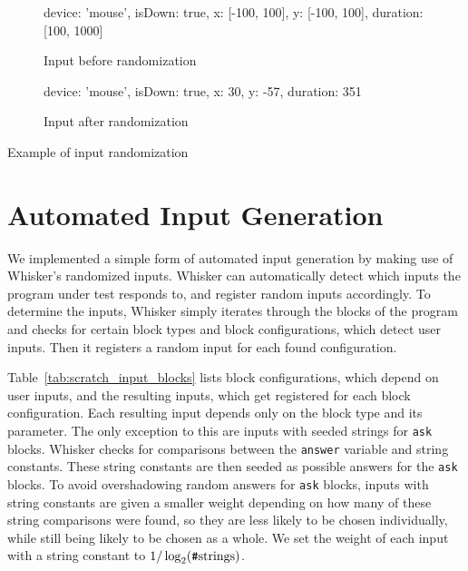 \begin{listing}[htpb]
    \centering

    \begin{subfigure}[b]{.35\textwidth}
        \begin{javascriptcode}
            {
                device: 'mouse',
                isDown: true,
                x: [-100, 100],
                y: [-100, 100],
                duration: [100, 1000]
            }
        \end{javascriptcode}
        \vspace{-\bigskipamount}
        \caption{Input before randomization}
    \end{subfigure}
    \hspace{.08\textwidth}
    \begin{subfigure}[b]{.35\textwidth}
        \begin{javascriptcode}
            {
                device: 'mouse',
                isDown: true,
                x: 30,
                y: -57,
                duration: 351
            }
        \end{javascriptcode}
        \vspace{-\bigskipamount}
        \caption{Input after randomization}
    \end{subfigure}

    \caption{Example of input randomization}
    \label{fig:input_randomization_example}
\end{listing}

\section{Automated Input Generation}

We implemented a simple form of automated input generation by making use of Whisker's randomized inputs.
Whisker can automatically detect which inputs the program under test responds to,
and register random inputs accordingly.
To determine the inputs,
Whisker simply iterates through the blocks of the program and checks for certain block types and block configurations,
which detect user inputs.
Then it registers a random input for each found configuration.
\parspace

Table~\ref{tab:scratch_input_blocks} lists block configurations, which depend on user inputs,
and the resulting inputs, which get registered for each block configuration.
Each resulting input depends only on the block type and its parameter.
The only exception to this are inputs with seeded strings for \texttt{ask} blocks.
Whisker checks for comparisons between the \texttt{answer} variable and string constants.
These string constants are then seeded as possible answers for the \texttt{ask} blocks.
To avoid overshadowing random answers for \texttt{ask} blocks,
inputs with string constants are given a smaller weight depending on how many of these string comparisons were found,
so they are less likely to be chosen individually, while still being likely to be chosen as a whole.
We set the weight of each input with a string constant to $1 / \log_2(\text{\texttt{\#}strings})$.

